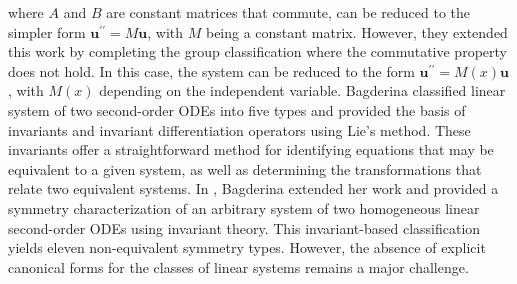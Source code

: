 \documentclass[12pt]{article}
\begin{document}
where $A$ and $B$ are constant matrices that commute, can be reduced to the simpler form $\textbf{u}^{\prime\prime}=M\textbf{u}$, with $M$ being a constant matrix. However, they extended this work by completing the group classification where the commutative property does not hold. In this case, the system can be reduced to the form
$\textbf{u}^{\prime\prime}=M(x)\textbf{u}$, with $M(x)$ depending on the independent variable. Bagderina \cite{p20} classified linear system of two 
second-order ODEs into five types and provided the basis of invariants and invariant differentiation operators using Lie's method. These invariants offer a straightforward method for identifying equations that may be equivalent to a given system, as well as determining the transformations that relate two equivalent systems. In \cite{R2}, Bagderina extended her work and provided a symmetry characterization of an arbitrary system of two homogeneous linear second-order ODEs using invariant theory. This invariant-based classification yields eleven non-equivalent symmetry types. However, the absence of explicit canonical forms for the classes of linear systems remains a major challenge.\\
\end{document}

